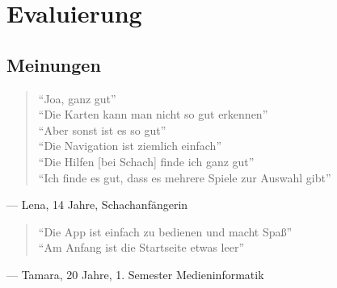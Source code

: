 \chapter{Evaluierung}

\section{Meinungen}

\begin{quote}
``Joa, ganz gut'' \\
``Die Karten kann man nicht so gut erkennen'' \\
``Aber sonst ist es so gut'' \\
``Die Navigation ist ziemlich einfach'' \\
``Die Hilfen [bei Schach] finde ich ganz gut'' \\
``Ich finde es gut, dass es mehrere Spiele zur Auswahl gibt''
\end{quote}
--- Lena, 14 Jahre, Schachanfängerin
\begin{quote}
``Die App ist einfach zu bedienen und macht Spaß'' \\
``Am Anfang ist die Startseite etwas leer'' 
\end{quote}
--- Tamara, 20 Jahre, 1. Semester Medieninformatik